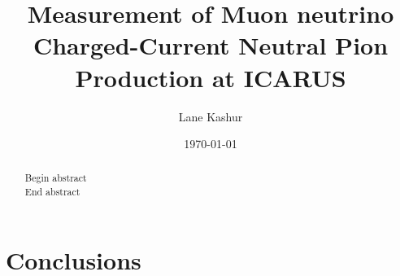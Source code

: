 \documentclass[]{article}
\title{Measurement of Muon neutrino Charged-Current Neutral Pion Production at ICARUS}
\author{Lane Kashur}
\date{\today}
\begin{document}
\maketitle

\begin{abstract}
Begin abstract \vspace{1cm} \\

End abstract
\end{abstract}

\tableofcontents







\section{Conclusions}

%

\printbibliography
\end{document}
